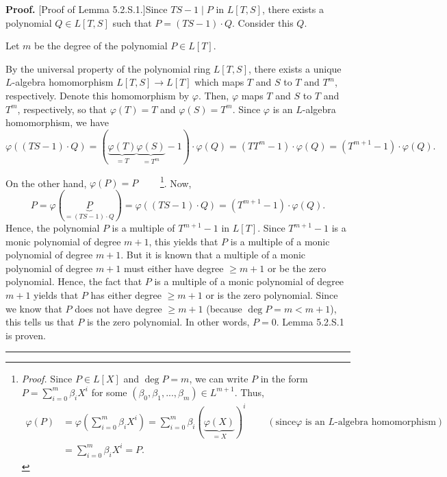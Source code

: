 \documentclass[numbers=enddot,12pt,final,onecolumn,notitlepage]{scrartcl}%
\newenvironment{proof}[1][Proof]{\noindent\textbf{#1.} }{\ \rule{0.5em}{0.5em}}
\begin{document}
\begin{proof}
[Proof of Lemma 5.2.S.1.]Since $TS-1\mid P$ in $L\left[  T,S\right]  $, there
exists a polynomial $Q\in L\left[  T,S\right]  $ such that $P=\left(
TS-1\right)  \cdot Q$. Consider this $Q$.

Let $m$ be the degree of the polynomial $P\in L\left[  T\right]  $.

By the universal property of the polynomial ring $L\left[  T,S\right]  $,
there exists a unique $L$-algebra homomorphism $L\left[  T,S\right]
\rightarrow L\left[  T\right]  $ which maps $T$ and $S$ to $T$ and $T^{m}$,
respectively. Denote this homomorphism by $\varphi$. Then, $\varphi$ maps $T$
and $S$ to $T$ and $T^{m}$, respectively, so that $\varphi\left(  T\right)
=T$ and $\varphi\left(  S\right)  =T^{m}$. Since $\varphi$ is an $L$-algebra
homomorphism, we have
\[
\varphi\left(  \left(  TS-1\right)  \cdot Q\right)  =\left(
\underbrace{\varphi\left(  T\right)  }_{=T}\underbrace{\varphi\left(
S\right)  }_{=T^{m}}-1\right)  \cdot\varphi\left(  Q\right)  =\left(
TT^{m}-1\right)  \cdot\varphi\left(  Q\right)  =\left(  T^{m+1}-1\right)
\cdot\varphi\left(  Q\right)  .
\]


On the other hand, $\varphi\left(  P\right)  =P$%
\ \ \ \ \footnote{\textit{Proof.} Since $P\in L\left[  X\right]  $ and $\deg
P=m$, we can write $P$ in the form $P=\sum\limits_{i=0}^{m}\beta_{i}X^{i}$ for
some $\left(  \beta_{0},\beta_{1},...,\beta_{m}\right)  \in L^{m+1}$. Thus,%
\begin{align*}
\varphi\left(  P\right)   &  =\varphi\left(  \sum\limits_{i=0}^{m}\beta
_{i}X^{i}\right)  =\sum\limits_{i=0}^{m}\beta_{i}\left(  \underbrace{\varphi
\left(  X\right)  }_{=X}\right)  ^{i}\ \ \ \ \ \ \ \ \ \ \left(  \text{since
}\varphi\text{ is an }L\text{-algebra homomorphism}\right) \\
&  =\sum\limits_{i=0}^{m}\beta_{i}X^{i}=P.
\end{align*}
}. Now,%
\[
P=\varphi\left(  \underbrace{P}_{=\left(  TS-1\right)  \cdot Q}\right)
=\varphi\left(  \left(  TS-1\right)  \cdot Q\right)  =\left(  T^{m+1}%
-1\right)  \cdot\varphi\left(  Q\right)  .
\]
Hence, the polynomial $P$ is a multiple of $T^{m+1}-1$ in $L\left[  T\right]
$. Since $T^{m+1}-1$ is a monic polynomial of degree $m+1$, this yields that
$P$ is a multiple of a monic polynomial of degree $m+1$. But it is known that
a multiple of a monic polynomial of degree $m+1$ must either have degree $\geq
m+1$ or be the zero polynomial. Hence, the fact that $P$ is a multiple of a
monic polynomial of degree $m+1$ yields that $P$ has either degree $\geq m+1$
or is the zero polynomial. Since we know that $P$ does not have degree $\geq
m+1$ (because $\deg P=m<m+1$), this tells us that $P$ is the zero polynomial.
In other words, $P=0$. Lemma 5.2.S.1 is proven.
\end{proof}
\end{document}
